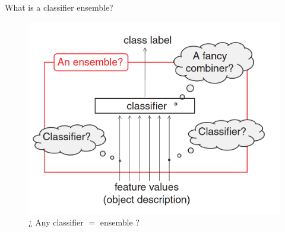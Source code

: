\documentclass[xcolor=table]{beamer}
\begin{document}
\begin{frame}{What is a classifier ensemble?}
\begin{figure}[ht]
\begin{minipage}[b]{0.5\linewidth}
  \end{minipage}%
  \pause
  \begin{minipage}[b]{0.5\linewidth}
    \centering
    \includegraphics[width=.5\linewidth]{Images/4.png} 
    \caption{¿ Any classifier \(=\) ensemble ?} 
    \vspace{4ex}
  \end{minipage} 
\end{figure}
\end{frame}
\end{document}
